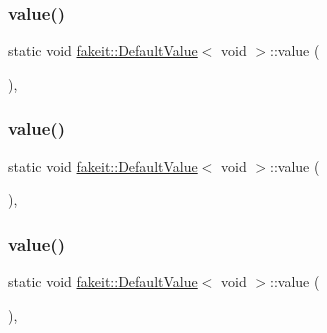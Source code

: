 \subsubsection{\texorpdfstring{value()}{value()}\hspace{0.1cm}{\footnotesize\ttfamily [1/9]}}
{\footnotesize\ttfamily static void \mbox{\hyperlink{structfakeit_1_1DefaultValue}{fakeit\+::\+Default\+Value}}$<$ void $>$\+::value (\begin{DoxyParamCaption}{ }\end{DoxyParamCaption})\hspace{0.3cm}{\ttfamily [inline]}, {\ttfamily [static]}}

\mbox{\label{structfakeit_1_1DefaultValue_3_01void_01_4_ac3bd138eb3812474184bd9d3e84d0d01}} 
\subsubsection{\texorpdfstring{value()}{value()}\hspace{0.1cm}{\footnotesize\ttfamily [2/9]}}
{\footnotesize\ttfamily static void \mbox{\hyperlink{structfakeit_1_1DefaultValue}{fakeit\+::\+Default\+Value}}$<$ void $>$\+::value (\begin{DoxyParamCaption}{ }\end{DoxyParamCaption})\hspace{0.3cm}{\ttfamily [inline]}, {\ttfamily [static]}}

\mbox{\label{structfakeit_1_1DefaultValue_3_01void_01_4_ac3bd138eb3812474184bd9d3e84d0d01}} 
\subsubsection{\texorpdfstring{value()}{value()}\hspace{0.1cm}{\footnotesize\ttfamily [3/9]}}
{\footnotesize\ttfamily static void \mbox{\hyperlink{structfakeit_1_1DefaultValue}{fakeit\+::\+Default\+Value}}$<$ void $>$\+::value (\begin{DoxyParamCaption}{ }\end{DoxyParamCaption})\hspace{0.3cm}{\ttfamily [inline]}, {\ttfamily [static]}}

